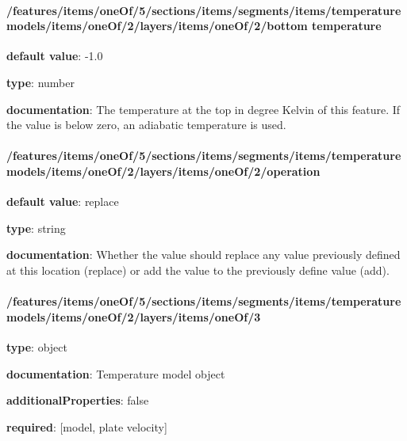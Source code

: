\begin{itemized}
\end{itemized}\paragraph{/features/items/oneOf/5/sections/items/segments/items/temperature models/items/oneOf/2/layers/items/oneOf/2/bottom temperature} \begin{itemized}
\item {\bf default value}: -1.0
\item {\bf type}: number
\item {\bf documentation}: The temperature at the top in degree Kelvin of this feature. If the value is below zero, an adiabatic temperature is used.
\end{itemized}\paragraph{/features/items/oneOf/5/sections/items/segments/items/temperature models/items/oneOf/2/layers/items/oneOf/2/operation} \begin{itemized}
\item {\bf default value}: replace
\item {\bf type}: string
\item {\bf documentation}: Whether the value should replace any value previously defined at this location (replace) or add the value to the previously define value (add).
\end{itemized}\paragraph{/features/items/oneOf/5/sections/items/segments/items/temperature models/items/oneOf/2/layers/items/oneOf/3} \begin{itemized}
\item {\bf type}: object
\item {\bf documentation}: Temperature model object
\item {\bf additionalProperties}: false
\item {\bf required}: [model, plate velocity]\end{itemized}
